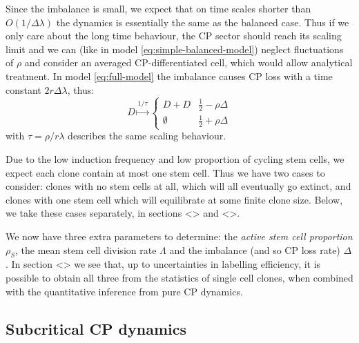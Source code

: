 \documentclass[10pt,UKenglish]{article}
\begin{document}
Since the imbalance is small, we expect that on time scales shorter than $O(1/\Delta \lambda)$ the dynamics is essentially the same as the balanced case. Thus if we only care about the long time behaviour, the CP sector should reach its scaling limit and we can (like in model \ref{eq:simple-balanced-model}) neglect fluctuations of $\rho$ and consider an averaged CP-differentiated cell, which would allow analytical treatment. In model \ref{eq:full-model} the imbalance causes CP loss with a time constant $2 r \Delta \lambda$, thus:
\begin{equation}
D \overset{1/\tau}{\longmapsto} \begin{cases}
D+D & \frac{1}{2} - \rho \Delta \\
\emptyset & \frac{1}{2} + \rho \Delta
\end{cases}\label{eq:subcritical-cp-model}
\end{equation}
with $\tau = \rho/r\lambda$ describes the same scaling behaviour.

Due to the low induction frequency and low proportion of cycling stem cells, we expect each clone contain at most one stem cell. Thus we have two cases to consider: clones with no stem cells at all, which will all eventually go extinct, and clones with one stem cell which will equilibrate at some finite clone size. Below, we take these cases separately, in sections <> and <>.

We now have three extra parameters to determine: the \emph{active stem cell proportion} $\rho_S$, the mean stem cell division rate $\Lambda$ and the imbalance (and so CP loss rate) $\Delta$. In section <> we see that, up to uncertainties in labelling efficiency, it is possible to obtain all three from the statistics of single cell clones, when combined with the quantitative inference from pure CP dynamics. 

\subsection{Subcritical CP dynamics}
\end{document}
